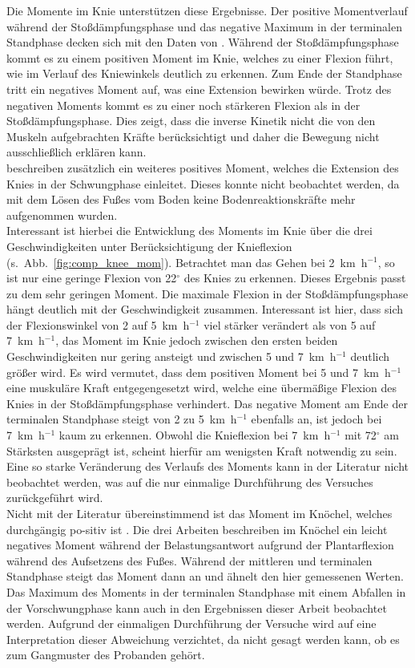 Die Momente im Knie unterstützen diese Ergebnisse. Der positive Momentverlauf während der Stoßdämpfungsphase und das negative Maximum in der terminalen Standphase decken sich mit den Daten von \textcite{perry2010gait}. Während der Stoßdämpfungsphase kommt es zu einem positiven Moment im Knie, welches zu einer Flexion führt, wie im Verlauf des Kniewinkels deutlich zu erkennen. Zum Ende der Standphase tritt ein negatives Moment auf, was eine Extension bewirken würde. Trotz des negativen Moments kommt es zu einer noch stärkeren Flexion als in der Stoßdämpfungsphase. Dies zeigt, dass die inverse Kinetik nicht die von den Muskeln aufgebrachten Kräfte berücksichtigt und daher die Bewegung nicht ausschließlich erklären kann.\\
\textcite{perry2010gait} beschreiben zusätzlich ein weiteres positives Moment, welches die Extension des Knies in der Schwungphase einleitet. Dieses konnte nicht beobachtet werden, da mit dem Lösen des Fußes vom Boden keine Bodenreaktionskräfte mehr aufgenommen wurden.\\
Interessant ist hierbei die Entwicklung des Moments im Knie über die drei Geschwindigkeiten unter Berücksichtigung der Knieflexion (s.~Abb.~\ref{fig:comp_knee_mom}). Betrachtet man das Gehen bei 2~km~h$^{-1}$, so ist nur eine geringe Flexion von 22$^{\circ}$ des Knies zu erkennen. Dieses Ergebnis passt zu dem sehr geringen Moment. Die maximale Flexion in der Stoßdämpfungsphase hängt deutlich mit der Geschwindigkeit zusammen. Interessant ist hier, dass sich der Flexionswinkel von 2 auf 5~km~h$^{-1}$  viel stärker verändert als von 5 auf 7~km~h$^{-1}$, das Moment im Knie jedoch zwischen den ersten beiden Geschwindigkeiten nur gering ansteigt und zwischen 5 und 7~km~h$^{-1}$ deutlich größer wird. Es wird vermutet, dass dem positiven Moment bei 5 und 7~km~h$^{-1}$ eine muskuläre Kraft entgegengesetzt wird, welche eine übermäßige Flexion des Knies in der Stoßdämpfungsphase verhindert. Das negative Moment am Ende der terminalen Standphase steigt von 2 zu 5~km~h$^{-1}$ ebenfalls an, ist jedoch bei 7~km~h$^{-1}$ kaum zu erkennen. Obwohl die Knieflexion bei 7~km~h$^{-1}$ mit 72$^{\circ}$ am Stärksten ausgeprägt ist, scheint hierfür am wenigsten Kraft notwendig zu sein. Eine so starke Veränderung des Verlaufs des Moments kann in der Literatur nicht beobachtet werden, was auf die nur einmalige Durchführung des Versuches zurückgeführt wird.\\
Nicht mit der Literatur übereinstimmend ist das Moment im Knöchel, welches durchgängig po-sitiv ist \parencite{eng1995kinetic, lay2006effects, perry2010gait}. Die drei Arbeiten beschreiben im Knöchel ein leicht negatives Moment während der Belastungsantwort aufgrund der Plantarflexion während des Aufsetzens des Fußes. Während der mittleren und terminalen Standphase steigt das Moment dann an und ähnelt den hier gemessenen Werten. Das Maximum des Moments in der terminalen Standphase mit einem Abfallen in der Vorschwungphase kann auch in den Ergebnissen dieser Arbeit beobachtet werden. Aufgrund der einmaligen Durchführung der Versuche wird auf eine Interpretation dieser Abweichung verzichtet, da nicht gesagt werden kann, ob es zum Gangmuster des Probanden gehört.\\
